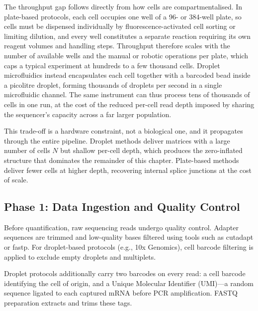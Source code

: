 The throughput gap follows directly from how cells are compartmentalised. In plate-based protocols, each cell occupies one well of a 96- or 384-well plate, so cells must be dispensed individually by fluorescence-activated cell sorting or limiting dilution, and every well constitutes a separate reaction requiring its own reagent volumes and handling steps. Throughput therefore scales with the number of available wells and the manual or robotic operations per plate, which caps a typical experiment at hundreds to a few thousand cells. Droplet microfluidics instead encapsulates each cell together with a barcoded bead inside a picolitre droplet, forming thousands of droplets per second in a single microfluidic channel. The same instrument can thus process tens of thousands of cells in one run, at the cost of the reduced per-cell read depth imposed by sharing the sequencer's capacity across a far larger population.

This trade-off is a hardware constraint, not a biological one, and it propagates through the entire pipeline. Droplet methods deliver matrices with a large number of cells $N$ but shallow per-cell depth, which produces the zero-inflated structure that dominates the remainder of this chapter. Plate-based methods deliver fewer cells at higher depth, recovering internal splice junctions at the cost of scale.

\subsection{Phase 1: Data Ingestion and Quality Control}
Before quantification, raw sequencing reads undergo quality control. Adapter sequences are trimmed and low-quality bases filtered using tools such as cutadapt or fastp. For droplet-based protocols (e.g., 10x Genomics), cell barcode filtering is applied to exclude empty droplets and multiplets.

Droplet protocols additionally carry two barcodes on every read: a cell barcode identifying the cell of origin, and a Unique Molecular Identifier (UMI)---a random sequence ligated to each captured mRNA before PCR amplification. FASTQ preparation extracts and trims these tags.


